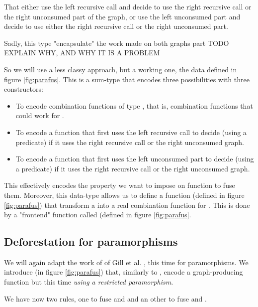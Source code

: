 That either use the left recursive call and decide to use the right recursive call or the right unconsumed part of the graph, or use the left unconsumed part and decide to use either the right recursive call or the right unconsumed part.

Sadly, this type "encapsulate" the work made on both graphs part TODO EXPLAIN WHY, AND WHY IT IS A PROBLEM

So we will use a less classy approach, but a working one, the  data defined in figure \ref{fig:parafus}. This is a sum-type that encodes three possibilities with three constructors:
\begin{itemize}
\item[\minline{B.}] To encode combination functions of type , that is, combination functions that could work for .
\item[\minline{L.}] To encode a function that first uses the left recursive call to decide (using a predicate) if it uses the right recursive call or the right unconsumed graph.
\item[\minline{R.}] To encode a function that first uses the left unconsumed part to decide (using a predicate) if it uses the right recursive call or the right unconsumed graph.
\end{itemize}

This effectively encodes the property we want to impose on function to fuse them. Moreover, this data-type allows us to define a function  (defined in figure \ref{fig:parafus}) that transform a  into a real combination function for . This is done by a "frontend" function called  (defined in figure \ref{fig:parafus}.

\subsection{Deforestation for paramorphisms}
\label{sec:defor-para}

We will again adapt the work of of Gill et al. \cite{Gill:1993:SCD:165180.165214}, this time for paramorphisms. We introduce  (in figure \ref{fig:parafus}) that, similarly to , encode a graph-producing function but this time \emph{using a restricted paramorphism}.

We have now two rules, one to fuse  and  and an other to fuse  and .


